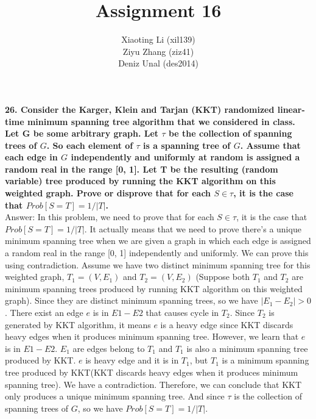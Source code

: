 \documentclass{article}
\title{Assignment 16}
\author{Xiaoting Li (xil139) \\
Ziyu Zhang (ziz41) \\
Deniz Unal (des2014)}
\date{}
\begin{document}
\maketitle

\noindent
\textbf{26. Consider the Karger, Klein and Tarjan (KKT) randomized linear-time minimum spanning tree algorithm that we considered in class. Let G be some arbitrary graph. Let $\tau$ be the collection of spanning trees of $G$. So each element of $\tau$ is a spanning tree of $G$. Assume that each edge in $G$ independently and uniformly at random is assigned a random real in the range [0, 1]. Let T be the resulting (random variable) tree produced by running the KKT algorithm on this weighted graph. Prove or disprove that for each $S\in \tau$, it is the case that $Prob[S=T]=1/|T|$. } \\ \newline
Answer: In this problem, we need to prove that for each $S\in \tau$, it is the case that $Prob[S=T]=1/|T|$. It actually means that we need to prove there's a unique minimum spanning tree when we are given a graph in which each edge is assigned a random real in the range [0, 1] independently and uniformly. We can prove this using contradiction. Assume we have two distinct minimum spanning tree for this weighted graph, $T_1 = (V, E_1)$ and $T_2 = (V, E_2)$ (Suppose both $T_1$ and $T_2$ are minimum spanning trees produced by running KKT algorithm on this weighted graph). Since they are distinct minimum spanning trees, so we have $|E_1 - E_2| > 0$. There exist an edge $e$ is in $E1 - E2$ that causes cycle in $T_2$. Since $T_2$ is generated by KKT algorithm, it means $e$ is a heavy edge since KKT discards heavy edges when it produces minimum spanning tree. However, we learn that $e$ is in $E1 - E2$. $E_1$ are edges belong to $T_1$ and $T_1$ is also a minimum spanning tree produced by KKT. $e$ is heavy edge and it is in $T_1$, but $T_1$ is a minimum spanning tree produced by KKT(KKT discards heavy edges when it produces minimum spanning tree). We have a contradiction. Therefore, we can conclude that KKT only produces a unique minimum spanning tree. And since $\tau$ is the collection of spanning trees of $G$, so we have $Prob[S=T]=1/|T|$.\\ \newline
\end{document}
